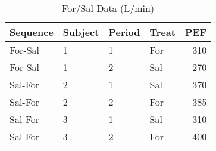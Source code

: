 \begin{table}

\caption{\label{tab:forSalData}For/Sal Data (L/min)}
\centering
\begin{tabular}[t]{llllr}
\toprule
Sequence & Subject & Period & Treat & PEF\\
\midrule
For-Sal & 1 & 1 & For & 310\\
For-Sal & 1 & 2 & Sal & 270\\
Sal-For & 2 & 1 & Sal & 370\\
Sal-For & 2 & 2 & For & 385\\
Sal-For & 3 & 1 & Sal & 310\\
Sal-For & 3 & 2 & For & 400\\
\bottomrule
\end{tabular}
\end{table}
